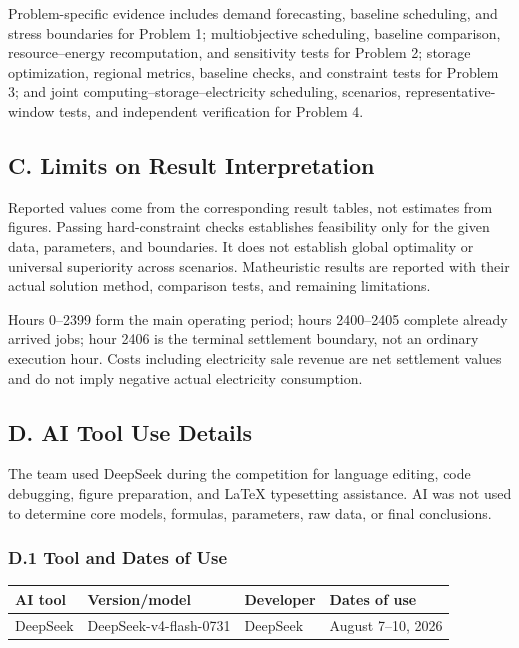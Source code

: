 Problem-specific evidence includes demand forecasting, baseline scheduling, and stress boundaries for Problem 1; multiobjective scheduling, baseline comparison, resource--energy recomputation, and sensitivity tests for Problem 2; storage optimization, regional metrics, baseline checks, and constraint tests for Problem 3; and joint computing--storage--electricity scheduling, scenarios, representative-window tests, and independent verification for Problem 4.

\subsection*{C. Limits on Result Interpretation}

Reported values come from the corresponding result tables, not estimates from figures. Passing hard-constraint checks establishes feasibility only for the given data, parameters, and boundaries. It does not establish global optimality or universal superiority across scenarios. Matheuristic results are reported with their actual solution method, comparison tests, and remaining limitations.

Hours 0--2399 form the main operating period; hours 2400--2405 complete already arrived jobs; hour 2406 is the terminal settlement boundary, not an ordinary execution hour. Costs including electricity sale revenue are net settlement values and do not imply negative actual electricity consumption.

\subsection*{D. AI Tool Use Details}

The team used DeepSeek during the competition for language editing, code debugging, figure preparation, and LaTeX typesetting assistance. AI was not used to determine core models, formulas, parameters, raw data, or final conclusions.

\subsubsection*{D.1 Tool and Dates of Use}

\begin{table}[H]
    \centering
    \small
    \renewcommand{\arraystretch}{1.05}
    \setlength{\tabcolsep}{3pt}
    \begin{tabularx}{0.96\textwidth}{>{\centering\arraybackslash}p{}>{\centering\arraybackslash}p{}>{\centering\arraybackslash}X>{\centering\arraybackslash}p{}}
        \toprule
        AI tool & Version/model & Developer & Dates of use \\
        \midrule
        DeepSeek & DeepSeek-v4-flash-0731 & DeepSeek & August 7--10, 2026 \\
        \bottomrule
    \end{tabularx}
\end{table}

